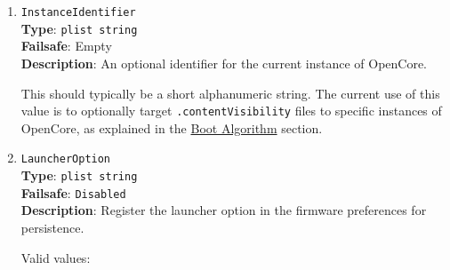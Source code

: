 \documentclass[]{article}
\providecommand{\tightlist}{%
  \setlength{\itemsep}{0pt}\setlength{\parskip}{0pt}}
\begin{document}
\begin{enumerate}
  An entry is considered auxiliary when at least one of the following applies:

  \begin{itemize}
  \tightlist
    \item Entry is macOS recovery.
    \item Entry is macOS Time Machine.
    \item Entry is explicitly marked as \texttt{Auxiliary}.
    \item Entry is system (e.g. \texttt{Reset NVRAM}).
  \end{itemize}

  To display all entries, the picker menu can be reloaded into ``Extended Mode'' by pressing the
  \texttt{Spacebar} key. Hiding auxiliary entries may increase boot performance on multi-disk systems.


\item
  \texttt{InstanceIdentifier}\\
  \textbf{Type}: \texttt{plist\ string}\\
  \textbf{Failsafe}: Empty\\
  \textbf{Description}: An optional identifier for the current instance of OpenCore.

  This should typically be a short alphanumeric string. The current use of this value is
  to optionally target \texttt{.contentVisibility} files to specific instances of OpenCore,
  as explained in the \hyperref[bootalgorithm]{Boot Algorithm} section.

\item
  \texttt{LauncherOption}\\
  \textbf{Type}: \texttt{plist\ string}\\
  \textbf{Failsafe}: \texttt{Disabled}\\
  \textbf{Description}: Register the launcher option in the firmware preferences for persistence.

  Valid values:


\end{enumerate}
\end{document}
